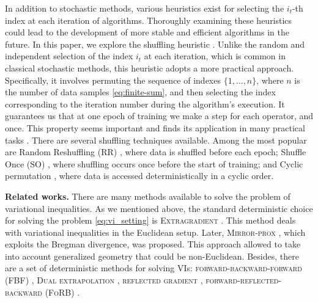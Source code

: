 \documentclass{article}
\begin{document}
In addition to stochastic methods, various heuristics exist for selecting the \(i_t\)-th index at each iteration of algorithms. Thoroughly examining these heuristics could lead to the development of more stable and efficient algorithms in the future. In this paper, we explore the shuffling heuristic \citep{mishchenko2020random, safran2020good, koloskova2024convergence, malinovsky2023random}. Unlike the random and independent selection of the index \(i_t\) at each iteration, which is common in classical stochastic methods, this heuristic adopts a more practical approach. Specifically, it involves permuting the sequence of indexes \(\{1, \ldots, n\}\), where $n$ is the number of data samples \eqref{eq:finite-sum}, and then selecting the index corresponding to the iteration number during the algorithm's execution. It guarantees us that at one epoch of training we make a step for each operator, and once. This property seems important and finds its application in many practical tasks \citep{chambolle2011first, xu2004maximum, bach2008convex}. There are several shuffling techniques available. Among the most popular are Random Reshuffling (RR) \citep{gurbuzbalaban2021random, haochen2019random, nagaraj2019sgd}, where data is shuffled before each epoch; Shuffle Once (SO) \citep{safran2020good, rajput2020closing}, where shuffling occurs once before the start of training; and Cyclic permutation \citep{mangasarian1993serial, bertsekas2000gradient, nedic2001incremental, li2019incremental}, where data is accessed deterministically in a cyclic order.

\textbf{Related works.}
There are many methods available to solve the problem of variational inequalities. As we mentioned above, the standard deterministic choice for solving the problem \eqref{eq:vi_setting} is \textsc{Extragradient} \citep{korpelevich1976extragradient}. This method deals with variational inequalities in the Euclidean setup. Later, \textsc{Mirror-prox} \citep{nemirovski2004prox}, which exploits the Bregman divergence, was proposed. This approach allowed to take into account generalized geometry that could be non-Euclidean. Besides, there are a set of deterministic methods for solving VIs: \textsc{forward-backward-forward (FBF)} \citep{tseng2000modified}, \textsc{Dual extrapolation} \citep{nesterov2007dual}, \textsc{reflected gradient} \citep{malitsky2015projected}, \textsc{forward-reflected-backward (FoRB)} \citep{malitsky2020forward}. 
\end{document}
